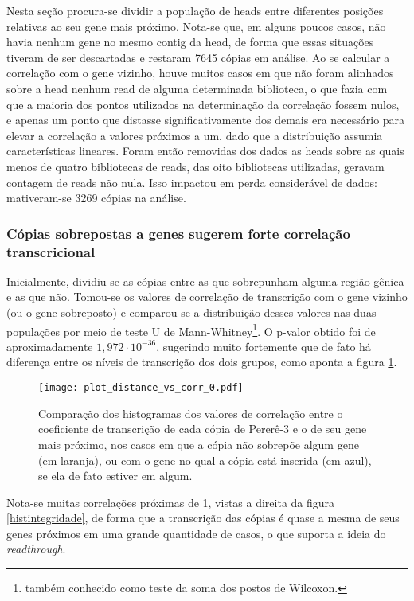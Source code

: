 \documentclass[12pt]{article}
\begin{document}
\begin{multicols}{2}
Nesta seção procura-se dividir a população de heads entre diferentes posições relativas ao seu gene mais próximo. Nota-se que, em alguns poucos casos, não havia nenhum gene no mesmo contig da head, de forma que essas situações tiveram de ser descartadas e restaram 7645 cópias em análise. Ao se calcular a correlação com o gene vizinho, houve muitos casos em que não foram alinhados sobre a head nenhum read de alguma determinada biblioteca, o que fazia com que a maioria dos pontos utilizados na determinação da correlação fossem nulos, e apenas um ponto que distasse significativamente dos demais era necessário para elevar a correlação a valores próximos a um, dado que a distribuição assumia características lineares. Foram então removidas dos dados as heads sobre as quais menos de quatro bibliotecas de reads, das oito bibliotecas utilizadas, geravam contagem de reads não nula. Isso impactou em perda considerável de dados: mativeram-se 3269 cópias na análise.

\subsubsection{Cópias sobrepostas a genes sugerem forte correlação transcricional}
Inicialmente, dividiu-se as cópias entre as que sobrepunham alguma região gênica e as que não. Tomou-se os valores de correlação de transcrição com o gene vizinho (ou o gene sobreposto) e comparou-se a distribuição desses valores nas duas populações por meio de teste U de Mann-Whitney\footnote{também conhecido como teste da soma dos postos de Wilcoxon.}. O p-valor obtido foi de aproximadamente \(1,972 \cdot 10^{-36}\), sugerindo muito fortemente que de fato há diferença entre os níveis de transcrição dos dois grupos, como aponta a figura \ref{histolap}.

\begin{figure}[H]
	\centering
	\label{histolap}
	\texttt{[image: plot\_distance\_vs\_corr\_0.pdf]}
	\caption{Comparação dos histogramas dos valores de correlação entre o coeficiente de transcrição de cada cópia de Pererê-3 e o de seu gene mais próximo, nos casos em que a cópia não sobrepõe algum gene (em laranja), ou com o gene no qual a cópia está inserida (em azul), se ela de fato estiver em algum.}
\end{figure}

Nota-se muitas correlações próximas de 1, vistas a direita da figura \ref{histintegridade}, de forma que a transcrição das cópias é quase a mesma de seus genes próximos em uma grande quantidade de casos, o que suporta a ideia do \textit{readthrough}.


\end{multicols}
\end{document}
